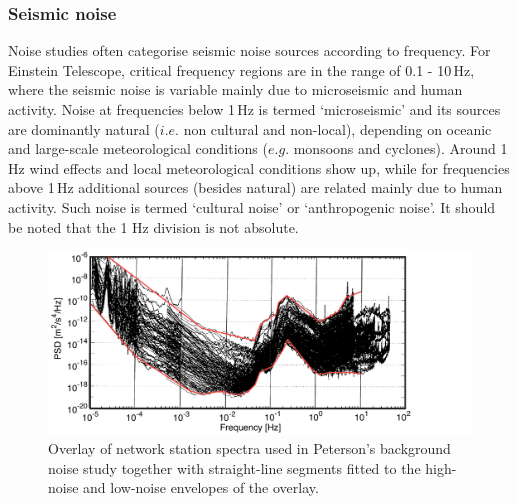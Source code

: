
\FloatBarrier
\subsubsection{Seismic noise}
\label{SeismicNoise}
Noise studies \cite{Bard2003, Gutenberg1958, Asten1984, Peck2008} often categorise seismic noise sources according to frequency. For Einstein Telescope, critical frequency regions are in the range of 0.1 - 10\,Hz, where the seismic noise is variable mainly due to microseismic and human activity. Noise at frequencies below 1\,Hz is termed `microseismic' and its sources are dominantly natural ($i.e.$ non cultural and non-local), depending on oceanic and large-scale meteorological conditions ($e.g.$ monsoons and cyclones). Around 1\,Hz wind effects and local meteorological conditions show up, while for frequencies above 1\,Hz additional sources (besides natural) are related mainly due to human activity. Such noise is termed `cultural noise' or `anthropogenic noise'. It should be noted that the 1 Hz division is not absolute.
 \begin{figure}[h!]
	\begin{center}
		 \includegraphics[width=17cm]{./Sec_SiteInfra/Figures/peterson2.pdf}
			\caption{Overlay of network station spectra used in Peterson's background noise study \cite{Peterson1993} together with straight-line segments fitted to the high-noise and low-noise envelopes of the overlay.}		
			\label{fig3.1}
	\end{center}
\end{figure}

